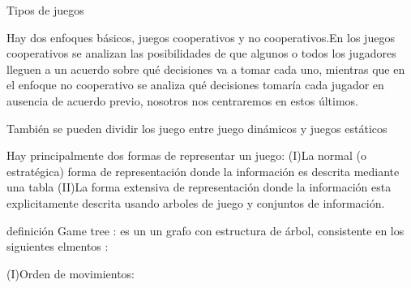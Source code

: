 \documentclass[14pt, a4paper]{article} %
\begin{document}
Tipos de juegos

Hay dos enfoques básicos, juegos cooperativos y no cooperativos.En los juegos cooperativos se analizan las posibilidades de que algunos o todos los jugadores lleguen a un acuerdo sobre qué decisiones va a tomar cada uno, mientras que en el enfoque no cooperativo se analiza qué decisiones tomaría cada jugador en ausencia de acuerdo previo, nosotros nos centraremos en estos últimos.

También se pueden dividir los juego entre juego dinámicos y juegos estáticos

Hay principalmente dos formas de representar un juego:
(I)La normal (o estratégica) forma de representación donde la información es descrita mediante una tabla
(II)La forma extensiva de representación donde la información esta explicitamente descrita usando arboles de juego y conjuntos de información.

definición Game tree :
es un un grafo con estructura de árbol, consistente en los siguientes elmentos :

(I)Orden de movimientos:









\newpage

\end{document}
